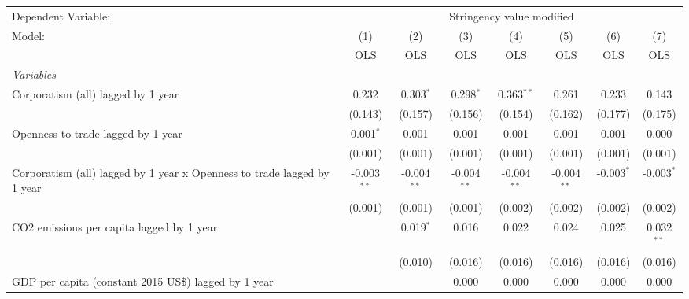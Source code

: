 
\begingroup
\centering
\begin{tabular}{lccccccc}
   \toprule
   Dependent Variable: & \multicolumn{7}{c}{Stringency value modified}\\
   Model:                                                                  & (1)           & (2)           & (3)           & (4)           & (5)           & (6)          & (7)\\  
                                                                           &  OLS          & OLS           & OLS           & OLS           & OLS           & OLS          & OLS\\  
   \midrule
   \emph{Variables}\\
   Corporatism (all) lagged by 1 year                                      & 0.232         & 0.303$^{*}$   & 0.298$^{*}$   & 0.363$^{**}$  & 0.261         & 0.233        & 0.143\\   
                                                                           & (0.143)       & (0.157)       & (0.156)       & (0.154)       & (0.162)       & (0.177)      & (0.175)\\   
   Openness to trade lagged by 1 year                                      & 0.001$^{*}$   & 0.001         & 0.001         & 0.001         & 0.001         & 0.001        & 0.000\\   
                                                                           & (0.001)       & (0.001)       & (0.001)       & (0.001)       & (0.001)       & (0.001)      & (0.001)\\   
   Corporatism (all) lagged by 1 year x Openness to trade lagged by 1 year & -0.003$^{**}$ & -0.004$^{**}$ & -0.004$^{**}$ & -0.004$^{**}$ & -0.004$^{**}$ & -0.003$^{*}$ & -0.003$^{*}$\\   
                                                                           & (0.001)       & (0.001)       & (0.001)       & (0.002)       & (0.002)       & (0.002)      & (0.002)\\   
   CO2 emissions per capita lagged by 1 year                               &               & 0.019$^{*}$   & 0.016         & 0.022         & 0.024         & 0.025        & 0.032$^{**}$\\   
                                                                           &               & (0.010)       & (0.016)       & (0.016)       & (0.016)       & (0.016)      & (0.016)\\   
   GDP per capita (constant 2015 US\$) lagged by 1 year                    &               &               & 0.000         & 0.000         & 0.000         & 0.000        & 0.000\\   

\end{tabular}
